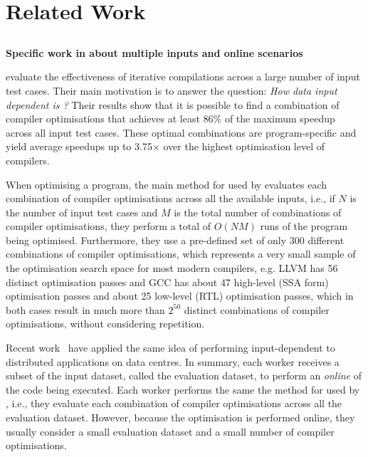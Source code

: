 \chapter{Related Work}

\section{{\IterComp}}

\textbf{Specific work in {\IterComp} about multiple inputs and online scenarios}

\cite{chen10,chen12a} evaluate the effectiveness of iterative compilations across a large number of input test cases.
Their main motivation is to answer the question:
\textit{How data input dependent is {\itercomp}?}
Their results show that it is possible to find a combination of compiler optimisations that achieves at least 86\% of the maximum speedup across all input test cases.
These optimal combinations are program-specific and yield average speedups up to 3.75$\times$ over the highest optimisation level of compilers.

When optimising a program, the main method for {\itercomp} used by \cite{chen10,chen12a} evaluates each combination of compiler optimisations across all the available inputs, i.e., if $N$ is the number of input test cases and $M$ is the total number of combinations of compiler optimisations, they perform a total of $O(NM)$ runs of the program being optimised.
Furthermore, they use a pre-defined set of only 300 different combinations of compiler optimisations, which represents a very small sample of the optimisation search space for most modern compilers, e.g.
LLVM has 56 distinct optimisation passes and GCC has about 47 high-level (SSA form) optimisation passes and about 25 low-level (RTL) optimisation passes, which in both cases result in much more than $2^{50}$ distinct combinations of compiler optimisations, without considering repetition.

Recent work~\citep{chen12b,fang15} have applied the same idea of performing input-dependent {\itercomp} to distributed applications on data centres.
In summary, each worker receives a subset of the input dataset, called the evaluation dataset, to perform an \textit{online} {\itercomp} of the code being executed.
Each worker performs the same the method for {\itercomp} used by \cite{chen10,chen12a}, i.e., they evaluate each combination of compiler optimisations across all the evaluation dataset.
However, because the optimisation is performed online, they usually consider a small evaluation dataset and a small number of compiler optimisations.

